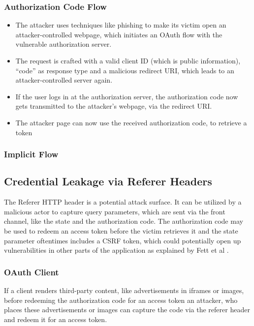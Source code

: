 \documentclass[
    fontsize=12pt,
    headings=small,
    parskip=half,           %
    bibliography=totoc,
    numbers=noenddot,       %
    open=any,               %
    ]{scrreprt}
\begin{document}
\subsubsection{Authorization Code Flow}
\begin{itemize}

    \item The attacker uses techniques like phishing to make its victim open an
        attacker-controlled webpage, which initiates an OAuth flow with the
        vulnerable authorization server.
	
    \item The request is crafted with a valid client ID (which is public
        information), ``code'' as response type and a malicious redirect URI,
        which leads to an attacker-controlled server again.
	
    \item If the user logs in at the authorization server, the authorization
        code now gets transmitted to the attacker's webpage, via the redirect
        URI.
	
    \item The attacker page can now use the received authorization code, to
        retrieve a token 

\end{itemize}

\subsubsection{Implicit Flow}


\subsection{Credential Leakage via Referer Headers}
The Referer HTTP header is a potential attack surface. It can be utilized by a
malicious actor to capture query parameters, which are sent via the front
channel, like the state and the authorization code. The authorization code may
be used to redeem an access token before the victim retrieves it and the state
parameter oftentimes includes a CSRF token, which could potentially open up
vulnerabilities in other parts of the application as explained by Fett et al
\cite{fett2016comprehensive}.

\subsubsection{OAuth Client}
If a client renders third-party content, like advertisements in iframes or
images, before redeeming the authorization code for an access token an
attacker, who places these advertisements or images can capture the code via
the referer header and redeem it for an access token.
\end{document}
